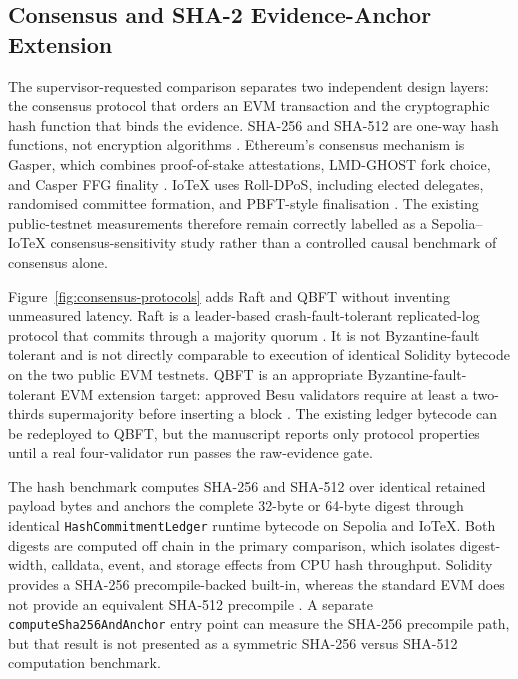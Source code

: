
\subsection{Consensus and SHA-2 Evidence-Anchor Extension}
The supervisor-requested comparison separates two independent design layers:
the consensus protocol that orders an EVM transaction and the cryptographic
hash function that binds the evidence. SHA-256 and SHA-512 are one-way hash
functions, not encryption algorithms \cite{nistFips1804}. Ethereum's consensus
mechanism is Gasper, which combines proof-of-stake attestations, LMD-GHOST fork
choice, and Casper FFG finality \cite{ethereumGasper}. IoTeX uses Roll-DPoS,
including elected delegates, randomised committee formation, and PBFT-style
finalisation \cite{iotexRollDpos}. The existing public-testnet measurements
therefore remain correctly labelled as a Sepolia--IoTeX consensus-sensitivity
study rather than a controlled causal benchmark of consensus alone.

Figure~\ref{fig:consensus-protocols} adds Raft and QBFT without inventing
unmeasured latency. Raft is a leader-based crash-fault-tolerant replicated-log
protocol that commits through a majority quorum \cite{raftPaper,fabricRaft}.
It is not Byzantine-fault tolerant and is not directly comparable to execution
of identical Solidity bytecode on the two public EVM testnets. QBFT is an
appropriate Byzantine-fault-tolerant EVM extension target: approved Besu
validators require at least a two-thirds supermajority before inserting a block
\cite{besuQbft}. The existing ledger bytecode can be redeployed to QBFT, but the
manuscript reports only protocol properties until a real four-validator run
passes the raw-evidence gate.






The hash benchmark computes SHA-256 and SHA-512 over identical retained payload
bytes and anchors the complete 32-byte or 64-byte digest through identical
\texttt{HashCommitmentLedger} runtime bytecode on Sepolia and IoTeX. Both
digests are computed off chain in the primary comparison, which isolates
digest-width, calldata, event, and storage effects from CPU hash throughput.
Solidity provides a SHA-256 precompile-backed built-in, whereas the standard EVM
does not provide an equivalent SHA-512 precompile \cite{solidityCrypto}. A
separate \texttt{computeSha256AndAnchor} entry point can measure the SHA-256
precompile path, but that result is not presented as a symmetric SHA-256 versus
SHA-512 computation benchmark.

